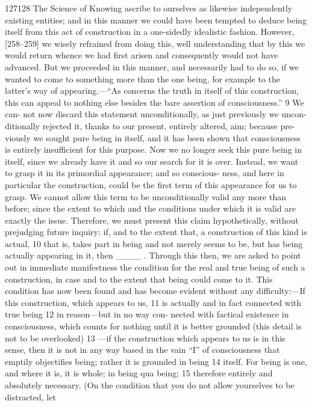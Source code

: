 127128
The Science of Knowing
ascribe to ourselves as likewise independently existing entities; and in this
manner we could have been tempted to deduce being itself from this act of
construction in a one-sidedly idealistic fashion. However, [258–259] we
wisely refrained from doing this, well understanding that by this we would
return whence we had first arisen and consequently would not have advanced.
But we proceeded in this manner, and necessarily had to do so, if we wanted
to come to something more than the one being, for example to the latter’s way
of appearing.—“As concerns the truth in itself of this construction, this can
appeal to nothing else besides the bare assertion of consciousness.” 9 We can-
not now discard this statement unconditionally, as just previously we uncon-
ditionally rejected it, thanks to our present, entirely altered, aim; because pre-
viously we sought pure being in itself, and it has been shown that
consciousness is entirely insufficient for this purpose. Now we no longer seek
this pure being in itself, since we already have it and so our search for it is over.
Instead, we want to grasp it in its primordial appearance; and so conscious-
ness, and here in particular the construction, could be the first term of this
appearance for us to grasp. We cannot allow this term to be unconditionally
valid any more than before; since the extent to which and the conditions under
which it is valid are exactly the issue. Therefore, we must present this claim
hypothetically, without prejudging future inquiry: if, and to the extent that, a
construction of this kind is actual, 10 that is, takes part in being and not merely
seems to be, but has being actually appearing in it, then ____ . Through this
then, we are asked to point out in immediate manifestness the condition for
the real and true being of such a construction, in case and to the extent that
being could come to it. This condition has now been found and has become
evident without any difficulty:—If this construction, which appears to us, 11 is
actually and in fact connected with true being 12 in reason—but in no way con-
nected with factical existence in consciousness, which counts for nothing until
it is better grounded (this detail is not to be overlooked) 13 —if the construction
which appears to us is in this sense, then it is not in any way based in the vain
“I” of consciousness that emptily objectifies being; rather it is grounded in
being 14 itself. For being is one, and where it is, it is whole; in being qua being; 15
therefore entirely and absolutely necessary.
(On the condition that you do not allow yourselves to be distracted, let

